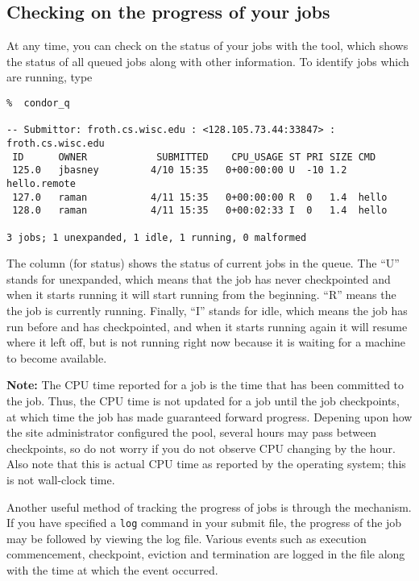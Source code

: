 \subsection{Checking on the progress of your jobs}
At any time, you can check on the status of your jobs with the 
tool, which shows the status of all queued jobs along with other information.
To identify jobs which are running, type
\begin{verbatim}
%  condor_q

-- Submittor: froth.cs.wisc.edu : <128.105.73.44:33847> : froth.cs.wisc.edu
 ID      OWNER            SUBMITTED    CPU_USAGE ST PRI SIZE CMD               
 125.0   jbasney         4/10 15:35   0+00:00:00 U  -10 1.2  hello.remote      
 127.0   raman           4/11 15:35   0+00:00:00 R  0   1.4  hello             
 128.0   raman           4/11 15:35   0+00:02:33 I  0   1.4  hello             

3 jobs; 1 unexpanded, 1 idle, 1 running, 0 malformed

\end{verbatim} 
The \verb@ST@ column (for status) shows the status of
current jobs in the queue. The ``U'' stands for unexpanded, which means
that the job has never checkpointed and when it starts running it will
start running from the beginning. ``R'' means the the job is currently
running. Finally, ``I'' stands for idle, which means the job has run
before and has checkpointed, and when it starts running again it will
resume where it left off, but is not running right now because it is
waiting for a machine to become available.

\textbf{Note:} The CPU time reported for a job is the time that has been
committed to the job.  Thus, the CPU time is not updated for a job until
the job checkpoints, at which time the job has made guaranteed forward 
progress.  Depening upon how the site administrator configured the pool,
several hours may pass between checkpoints, so do not worry if you do
not observe CPU changing by the hour.  Also note that this is actual CPU
time as reported by the operating system; this is not wall-clock time.

Another useful method of tracking the progress of jobs is through the
 mechanism.  If you have specified a \texttt{log} command in 
your submit file, the progress of the job may be followed by viewing the
log file.  Various events such as execution commencement, checkpoint, eviction 
and termination are logged in the file along with the time at which the event 
occurred.

